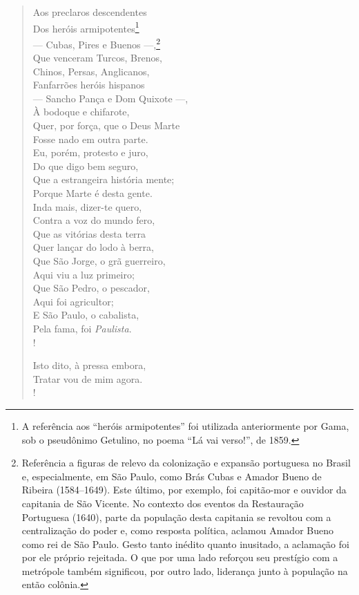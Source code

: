\begin{verse}
Aos preclaros descendentes\\
Dos heróis armipotentes\footnote{A referência aos ``heróis
  armipotentes'' foi utilizada anteriormente por Gama, sob o pseudônimo
  Getulino, no poema ``Lá vai verso!'', de 1859.}\\
--- Cubas, Pires e Buenos ---,\footnote{ Referência a figuras de relevo\label{amador}
  da colonização e expansão portuguesa no Brasil e, especialmente, em
  São Paulo, como Brás Cubas e Amador Bueno de Ribeira (1584--1649). Este
  último, por exemplo, foi capitão-mor e ouvidor da capitania de São
  Vicente. No contexto dos eventos da Restauração Portuguesa (1640),
  parte da população desta capitania se revoltou com a centralização do
  poder e, como resposta política, aclamou Amador Bueno como rei de São
  Paulo. Gesto tanto inédito quanto inusitado, a aclamação foi por ele
  próprio rejeitada. O que por uma lado reforçou seu prestígio com a
  metrópole também significou, por outro lado, liderança junto à
  população na então colônia.}\\
Que venceram Turcos, Brenos,\\
Chinos, Persas, Anglicanos,\\
Fanfarrões heróis hispanos\\
--- Sancho Pança e Dom Quixote ---,\\
À bodoque e chifarote,\\
Quer, por força, que o Deus Marte\\
Fosse nado em outra parte.\\
Eu, porém, protesto e juro,\\
Do que digo bem seguro,\\
Que a estrangeira história mente;\\
Porque Marte é desta gente.\\
Inda mais, dizer-te quero,\\
Contra a voz do mundo fero,\\
Que as vitórias desta terra\\
Quer lançar do lodo à berra,\\
Que São Jorge, o grã guerreiro,\\
Aqui viu a luz primeiro;\\
Que São Pedro, o pescador,\\
Aqui foi agricultor;\\
E São Paulo, o cabalista,\\
Pela fama, foi \emph{Paulista}.\\!

Isto dito, à pressa embora,\\
Tratar vou de mim agora.\\!


\end{verse}

